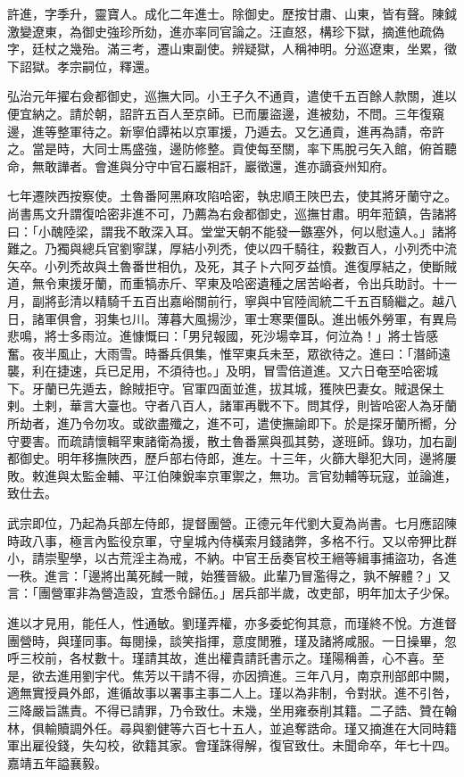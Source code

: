 \begin{pinyinscope}
許進，字季升，靈寶人。成化二年進士。除御史。歷按甘肅、山東，皆有聲。陳鉞激變遼東，為御史強珍所劾，進亦率同官論之。汪直怒，構珍下獄，摘進他疏偽字，廷杖之幾殆。滿三考，遷山東副使。辨疑獄，人稱神明。分巡遼東，坐累，徵下詔獄。孝宗嗣位，釋還。

弘治元年擢右僉都御史，巡撫大同。小王子久不通貢，遣使千五百餘人款關，進以便宜納之。請於朝，詔許五百人至京師。已而屢盜邊，進被劾，不問。三年復窺邊，進等整軍待之。新寧伯譚祐以京軍援，乃遁去。又乞通貢，進再為請，帝許之。當是時，大同士馬盛強，邊防修整。貢使每至關，率下馬脫弓矢入館，俯首聽命，無敢譁者。會進與分守中官石巖相訐，巖徵還，進亦謫袞州知府。

七年遷陜西按察使。土魯番阿黑麻攻陷哈密，執忠順王陜巴去，使其將牙蘭守之。尚書馬文升謂復哈密非進不可，乃薦為右僉都御史，巡撫甘肅。明年蒞鎮，告諸將曰：「小醜陸梁，謂我不敢深入耳。堂堂天朝不能發一鏃塞外，何以慰遠人。」諸將難之。乃獨與總兵官劉寧謀，厚結小列禿，使以四千騎往，殺數百人，小列禿中流矢卒。小列禿故與土魯番世相仇，及死，其子卜六阿歹益憤。進復厚結之，使斷賊道，無令東援牙蘭，而重犒赤斤、罕東及哈密遺種之居苦峪者，令出兵助討。十一月，副將彭清以精騎千五百出嘉峪關前行，寧與中官陸訚統二千五百騎繼之。越八日，諸軍俱會，羽集乜川。薄暮大風揚沙，軍士寒栗僵臥。進出帳外勞軍，有異烏悲鳴，將士多雨泣。進慷慨曰：「男兒報國，死沙場幸耳，何泣為！」將士皆感奮。夜半風止，大雨雪。時番兵俱集，惟罕東兵未至，眾欲待之。進曰：「潛師遠襲，利在捷速，兵已足用，不須待也。」及明，冒雪倍道進。又六日奄至哈密城下。牙蘭已先遁去，餘賊拒守。官軍四面並進，拔其城，獲陜巴妻女。賊退保土剌。土剌，華言大臺也。守者八百人，諸軍再戰不下。問其俘，則皆哈密人為牙蘭所劫者，進乃令勿攻。或欲盡殲之，進不可，遣使撫諭即下。於是探牙蘭所嚮，分守要害。而疏請懷輯罕東諸衛為援，散土魯番黨與孤其勢，遂班師。錄功，加右副都御史。明年移撫陜西，歷戶部右侍郎，進左。十三年，火篩大舉犯大同，邊將屢敗。敕進與太監金輔、平江伯陳銳率京軍禦之，無功。言官劾輔等玩寇，並論進，致仕去。

武宗即位，乃起為兵部左侍郎，提督團營。正德元年代劉大夏為尚書。七月應詔陳時政八事，極言內監役京軍，守皇城內侍橫索月錢諸弊，多格不行。又以帝狎比群小，請崇聖學，以古荒淫主為戒，不納。中官王岳奏官校王縉等緝事捕盜功，各進一秩。進言：「邊將出萬死馘一賊，始獲晉級。此輩乃冒濫得之，孰不解體？」又言：「團營軍非為營造設，宜悉令歸伍。」居兵部半歲，改吏部，明年加太子少保。

進以才見用，能任人，性通敏。劉瑾弄權，亦多委蛇徇其意，而瑾終不悅。方進督團營時，與瑾同事。每閱操，談笑指揮，意度閒雅，瑾及諸將咸服。一日操畢，忽呼三校前，各杖數十。瑾請其故，進出權貴請託書示之。瑾陽稱善，心不喜。至是，欲去進用劉宇代。焦芳以干請不得，亦因擠進。三年八月，南京刑部郎中闕，適無實授員外郎，進循故事以署事主事二人上。瑾以為非制，令對狀。進不引咎，三降嚴旨譙責。不得已請罪，乃令致仕。未幾，坐用雍泰削其籍。二子誥、贊在翰林，俱輸贖調外任。尋與劉健等六百七十五人，並追奪誥命。瑾又摘進在大同時籍軍出雇役錢，失勾校，欲籍其家。會瑾誅得解，復官致仕。未聞命卒，年七十四。嘉靖五年謚襄毅。


\end{pinyinscope}

